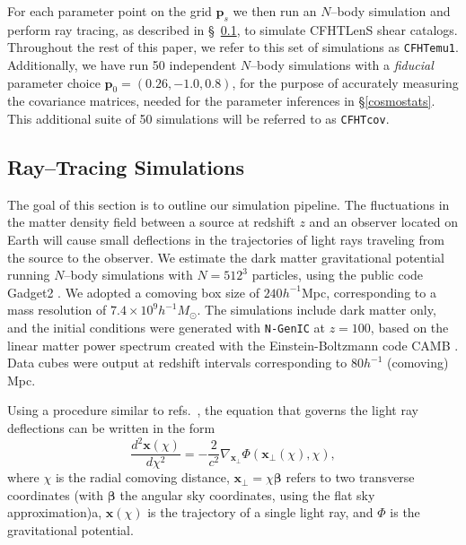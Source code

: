 \documentclass[reprint,aps,prd,superscriptaddress,showkeys,showpacs]{revtex4-1}
\begin{document}
For each parameter point on the grid $\mathbf{p}_s$ we then run an
$N$--body simulation and perform ray tracing, as described in
\S~\ref{raysim}, to simulate CFHTLenS shear catalogs.  Throughout the
rest of this paper, we refer to this set of simulations as
\texttt{CFHTemu1}.  Additionally, we have run 50 independent $N$--body
simulations with a \textit{fiducial} parameter choice
$\mathbf{p}_0=(0.26,-1.0,0.8)$, for the purpose of accurately
measuring the covariance matrices, needed for the parameter inferences
in \S\ref{cosmostats}. This additional suite of 50 simulations will
be referred to as \texttt{CFHTcov}.

\subsection{Ray--Tracing Simulations}
\label{raysim}

The goal of this section is to outline our simulation pipeline.  The
fluctuations in the matter density field between a source at redshift
$z$ and an observer located on Earth will cause small deflections in
the trajectories of light rays traveling from the source to the
observer. 
We estimate the dark matter gravitational potential running $N$--body
simulations with $N=512^3$ particles, using the public code Gadget2
\citep{Gadget2}. We adopted a comoving box size of $240h^{-1}$Mpc,
corresponding to a mass resolution of $7.4\times10^9h^{-1}M_\odot$.
The simulations include dark matter only, and the initial conditions
were generated with \texttt{N-GenIC} at $z=100$, based on the linear
matter power spectrum created with the Einstein-Boltzmann code CAMB
\cite{CAMB}. Data cubes were output at redshift intervals
corresponding to $80h^{-1}$ (comoving) Mpc.

Using a procedure similar to
refs.~\citep{RayTracingJain,RayTracingHartlap}, the equation that
governs the light ray deflections can be written in the form
\begin{equation}
\label{raytrajectory}
\frac{d^2\mathbf{x}(\chi)}{d\chi^2} = -\frac{2}{c^2}\nabla_{\mathbf{x}_\perp}\Phi(\mathbf{x}_\perp(\chi),\chi),
\end{equation}
where $\chi$ is the radial comoving distance,
$\mathbf{x}_\perp=\chi\pmb{\beta}$ refers to two transverse
coordinates (with $\pmb{\beta}$ the angular sky coordinates, using the
flat sky approximation)a, $\mathbf{x}(\chi)$ is the trajectory of a
single light ray, and $\Phi$ is the gravitational potential.
\end{document}
